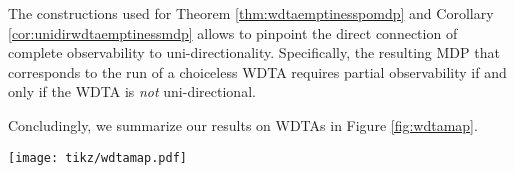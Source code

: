 The constructions used for Theorem \ref{thm:wdtaemptinesspomdp} and Corollary
\ref{cor:unidirwdtaemptinessmdp} allows to pinpoint the direct connection of
complete observability to uni-directionality. Specifically, the resulting
\ac{MDP} that corresponds to the run of a choiceless \ac{WDTA} requires partial
observability if and only if the \ac{WDTA} is \emph{not} uni-directional.

Concludingly, we summarize our results on \acp{WDTA} in Figure 
\ref{fig:wdtamap}.
\begin{drawing}
  \caption{
    A \enquote{map} of the presented results for \acp{WDTA}. Arrows marked with
    inclusion symbols are used to illustrate increasing expressiveness from
    the beginning to the end of the arrow (the equality symbol is striked out
    if it is a proven strict generalisation). Annotated $\cap$, $\cup$ and
    $\neg$ stand for closure under intersection, union and complement
    respectively. Naturally, a striked out version of one operater shows the
    proven lack of closure under it. Additionally, we use $B\nsubseteq P$ to
    state that a model restricted to a Büchi-condition is not included in a
    model with access to Parity-conditions. Colors encode decidability results
    for the emptiness problem: red illustrates undecidability, green
    decidability and purple decidability for Büchi- but undecidability for
    Parity-conditions.
  }
  \label{fig:wdtamap}
  \begin{center}
    \texttt{[image: tikz/wdtamap.pdf]}
  \end{center}
\end{drawing}
